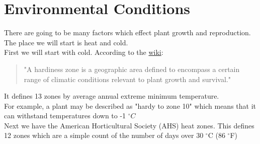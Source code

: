 \documentclass[10pt]{extarticle}
\begin{document}
\section{Environmental Conditions}
There are going to be many factors which effect plant growth and reproduction. The place we will start is heat and cold. \\
First we will start with cold. According to the \href{https://en.wikipedia.org/wiki/Hardiness_zone}{wiki}:
\begin{quote}
	"A hardiness zone is a geographic area defined to encompass a certain range of climatic conditions relevant to plant growth and survival."
\end{quote}
It defines 13 zones by average annual extreme minimum temperature.  \\
For example, a plant may be described as "hardy to zone 10" which means that it can withstand temperatures down to -1 $^{\circ} C$ \\
Next we have the American Horticultural Society (AHS) heat zones. This defines 12 zones which are a simple count of the number of days over 30 $^{\circ}$C (86 $^{\circ}$F)
\end{document}
